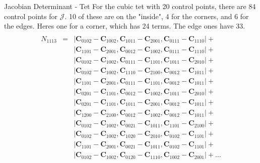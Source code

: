 \documentclass[12pt]{beamer}
\begin{document}
\begin{frame}{Jacobian Determinant - Tet}
For the cubic tet with 20 control points, there are 84 control points for $\mathcal{J}$. 10 of these are on the "inside", 4 for the corners, and 6 for the edges. Heres one for a corner, which has 24 terms. The edge ones have 33.
{
  \tiny
\begin{eqnarray*}
\\N_{1113}&=&\left|\mathbf{C}_{0102}-\mathbf{C}_{1002},\mathbf{C}_{1011}-\mathbf{C}_{2001},\mathbf{C}_{0111}-\mathbf{C}_{1110}\right|+\\&&\left|\mathbf{C}_{1101}-\mathbf{C}_{2001},\mathbf{C}_{0012}-\mathbf{C}_{1002},\mathbf{C}_{0111}-\mathbf{C}_{1110}\right|+\\&&\left|\mathbf{C}_{0102}-\mathbf{C}_{1002},\mathbf{C}_{0111}-\mathbf{C}_{1101},\mathbf{C}_{1011}-\mathbf{C}_{2010}\right|+\\&&\left|\mathbf{C}_{0102}-\mathbf{C}_{1002},\mathbf{C}_{1110}-\mathbf{C}_{2100},\mathbf{C}_{0012}-\mathbf{C}_{1011}\right|+\\&&\left|\mathbf{C}_{1101}-\mathbf{C}_{2001},\mathbf{C}_{0111}-\mathbf{C}_{1101},\mathbf{C}_{0012}-\mathbf{C}_{1011}\right|+\\&&\left|\mathbf{C}_{0201}-\mathbf{C}_{1101},\mathbf{C}_{0012}-\mathbf{C}_{1002},\mathbf{C}_{1011}-\mathbf{C}_{2010}\right|+\\&&\left|\mathbf{C}_{0201}-\mathbf{C}_{1101},\mathbf{C}_{1011}-\mathbf{C}_{2001},\mathbf{C}_{0012}-\mathbf{C}_{1011}\right|+\\&&\left|\mathbf{C}_{1200}-\mathbf{C}_{2100},\mathbf{C}_{0012}-\mathbf{C}_{1002},\mathbf{C}_{0012}-\mathbf{C}_{1011}\right|+\\&&\left|\mathbf{C}_{0102}-\mathbf{C}_{1002},\mathbf{C}_{0021}-\mathbf{C}_{1011},\mathbf{C}_{1101}-\mathbf{C}_{2100}\right|+\\&&\left|\mathbf{C}_{0102}-\mathbf{C}_{1002},\mathbf{C}_{1020}-\mathbf{C}_{2010},\mathbf{C}_{0102}-\mathbf{C}_{1101}\right|+\\&&\left|\mathbf{C}_{1101}-\mathbf{C}_{2001},\mathbf{C}_{0021}-\mathbf{C}_{1011},\mathbf{C}_{0102}-\mathbf{C}_{1101}\right|+\\&&\left|\mathbf{C}_{0102}-\mathbf{C}_{1002},\mathbf{C}_{0120}-\mathbf{C}_{1110},\mathbf{C}_{1002}-\mathbf{C}_{2001}\right|+\ldots
\end{eqnarray*}
}
\end{frame}
\end{document}
